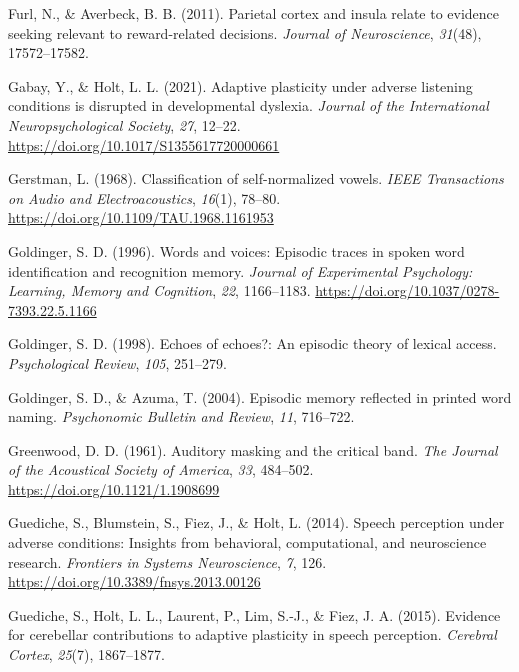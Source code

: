 \documentclass[
  11pt,
  english,
  man,floatsintext]{apa6}
\newlength{\cslhangindent}
\newlength{\cslentryspacingunit} %
\newenvironment{CSLReferences}[2] %
 {%
  \setlength{\parindent}{0pt}
  \ifodd #1
  \let\oldpar\par
  \def\par{\hangindent=\cslhangindent\oldpar}
  \fi
  \setlength{\parskip}{#2\cslentryspacingunit}
 }%
 {}
\begin{document}
\begin{CSLReferences}{1}{0}
\leavevmode{}%
Furl, N., \& Averbeck, B. B. (2011). Parietal cortex and insula relate to evidence seeking relevant to reward-related decisions. \emph{Journal of Neuroscience}, \emph{31}(48), 17572--17582.

\leavevmode{}%
Gabay, Y., \& Holt, L. L. (2021). Adaptive plasticity under adverse listening conditions is disrupted in developmental dyslexia. \emph{Journal of the International Neuropsychological Society}, \emph{27}, 12--22. \url{https://doi.org/10.1017/S1355617720000661}

\leavevmode{}%
Gerstman, L. (1968). Classification of self-normalized vowels. \emph{IEEE Transactions on Audio and Electroacoustics}, \emph{16}(1), 78--80. \url{https://doi.org/10.1109/TAU.1968.1161953}

\leavevmode{}%
Goldinger, S. D. (1996). Words and voices: Episodic traces in spoken word identification and recognition memory. \emph{Journal of Experimental Psychology: Learning, Memory and Cognition}, \emph{22}, 1166--1183. \url{https://doi.org/10.1037/0278-7393.22.5.1166}

\leavevmode{}%
Goldinger, S. D. (1998). Echoes of echoes?: An episodic theory of lexical access. \emph{Psychological Review}, \emph{105}, 251--279.

\leavevmode{}%
Goldinger, S. D., \& Azuma, T. (2004). Episodic memory reflected in printed word naming. \emph{Psychonomic Bulletin and Review}, \emph{11}, 716--722.

\leavevmode{}%
Greenwood, D. D. (1961). Auditory masking and the critical band. \emph{The Journal of the Acoustical Society of America}, \emph{33}, 484--502. \url{https://doi.org/10.1121/1.1908699}

\leavevmode{}%
Guediche, S., Blumstein, S., Fiez, J., \& Holt, L. (2014). Speech perception under adverse conditions: Insights from behavioral, computational, and neuroscience research. \emph{Frontiers in Systems Neuroscience}, \emph{7}, 126. \url{https://doi.org/10.3389/fnsys.2013.00126}

\leavevmode{}%
Guediche, S., Holt, L. L., Laurent, P., Lim, S.-J., \& Fiez, J. A. (2015). Evidence for cerebellar contributions to adaptive plasticity in speech perception. \emph{Cerebral Cortex}, \emph{25}(7), 1867--1877.


\end{CSLReferences}
\end{document}
